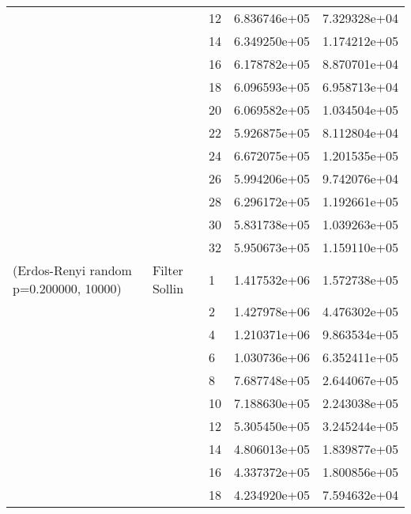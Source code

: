\begin{tabular}{lllrr}
                      &                     & 12 &  6.836746e+05 &  7.329328e+04 \\
                      &                     & 14 &  6.349250e+05 &  1.174212e+05 \\
                      &                     & 16 &  6.178782e+05 &  8.870701e+04 \\
                      &                     & 18 &  6.096593e+05 &  6.958713e+04 \\
                      &                     & 20 &  6.069582e+05 &  1.034504e+05 \\
                      &                     & 22 &  5.926875e+05 &  8.112804e+04 \\
                      &                     & 24 &  6.672075e+05 &  1.201535e+05 \\
                      &                     & 26 &  5.994206e+05 &  9.742076e+04 \\
                      &                     & 28 &  6.296172e+05 &  1.192661e+05 \\
                      &                     & 30 &  5.831738e+05 &  1.039263e+05 \\
                      &                     & 32 &  5.950673e+05 &  1.159110e+05 \\
(Erdos-Renyi random p=0.200000, 10000) & Filter Sollin & 1  &  1.417532e+06 &  1.572738e+05 \\
                      &                     & 2  &  1.427978e+06 &  4.476302e+05 \\
                      &                     & 4  &  1.210371e+06 &  9.863534e+05 \\
                      &                     & 6  &  1.030736e+06 &  6.352411e+05 \\
                      &                     & 8  &  7.687748e+05 &  2.644067e+05 \\
                      &                     & 10 &  7.188630e+05 &  2.243038e+05 \\
                      &                     & 12 &  5.305450e+05 &  3.245244e+05 \\
                      &                     & 14 &  4.806013e+05 &  1.839877e+05 \\
                      &                     & 16 &  4.337372e+05 &  1.800856e+05 \\
                      &                     & 18 &  4.234920e+05 &  7.594632e+04 \\

\end{tabular}
